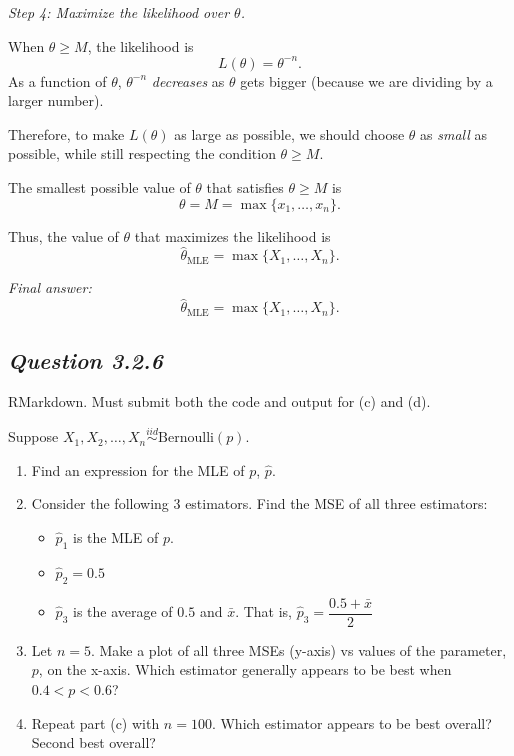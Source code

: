 \documentclass[11pt,letterpaper]{article}
\theoremstyle{remark}
\begin{document}
\textit{Step 4: Maximize the likelihood over $\theta$.}

When $\theta \ge M$, the likelihood is
\[
L(\theta) = \theta^{-n}.
\]
As a function of $\theta$, $\theta^{-n}$ \emph{decreases} as $\theta$ gets bigger (because we are dividing by a larger number).

Therefore, to make $L(\theta)$ as large as possible, we should choose $\theta$ as \emph{small} as possible, while still respecting the condition $\theta \ge M$.

The smallest possible value of $\theta$ that satisfies $\theta \ge M$ is
\[
\theta = M = \max\{x_1,\dots,x_n\}.
\]

Thus, the value of $\theta$ that maximizes the likelihood is
\[
\hat{\theta}_{\mathrm{MLE}} = \max\{X_1,\dots,X_n\}.
\]

\textit{Final answer:}
\[
\boxed{\hat{\theta}_{\mathrm{MLE}} = \max\{X_1,\dots,X_n\}.}
\]

\newpage

\subsection*{\textbf{\textit{Question 3.2.6}}}

RMarkdown. Must submit both the code and output for (c) and (d).

Suppose $X_1, X_2, \ldots, X_n \overset{iid}{\sim} \text{Bernoulli}(p)$.

\begin{enumerate}
    \item[(a)] Find an expression for the MLE of $p$, $\hat{p}$.
    \item[(b)] Consider the following 3 estimators. Find the MSE of all three estimators:
    \begin{itemize}
        \item $\hat{p}_1$ is the MLE of $p$.
        \item $\hat{p}_2 = 0.5$
        \item $\hat{p}_3$ is the average of $0.5$ and $\bar{x}$. That is, $\hat{p}_3 = \dfrac{0.5 + \bar{x}}{2}$
    \end{itemize}
    \item[(c)] Let $n = 5$. Make a plot of all three MSEs (y-axis) vs values of the parameter, $p$, on the x-axis. Which estimator generally appears to be best when $0.4 < p < 0.6$?
    \item[(d)] Repeat part (c) with $n = 100$. Which estimator appears to be best overall? Second best overall?
\end{enumerate}
\end{document}
